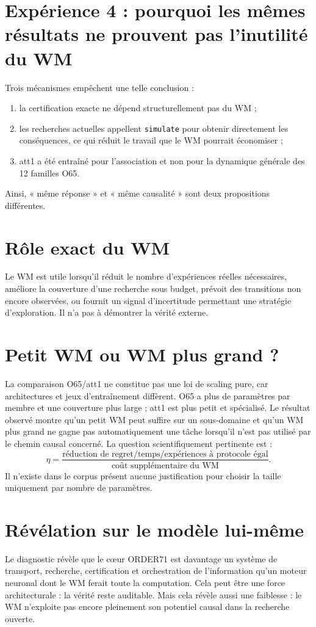 \documentclass[11pt,a4paper]{article}
\begin{document}
\section{Expérience 4 : pourquoi les mêmes résultats ne prouvent pas l'inutilité du WM}
Trois mécanismes empêchent une telle conclusion :
\begin{enumerate}
\item la certification exacte ne dépend structurellement pas du WM ;
\item les recherches actuelles appellent \texttt{simulate} pour obtenir directement les conséquences, ce qui réduit le travail que le WM pourrait économiser ;
\item att1 a été entraîné pour l'association et non pour la dynamique générale des 12 familles O65.
\end{enumerate}
Ainsi, « même réponse » et « même causalité » sont deux propositions différentes.
\section{Rôle exact du WM}
Le WM est utile lorsqu'il réduit le nombre d'expériences réelles nécessaires, améliore la couverture d'une recherche sous budget, prévoit des transitions non encore observées, ou fournit un signal d'incertitude permettant une stratégie d'exploration. Il n'a pas à démontrer la vérité externe.
\section{Petit WM ou WM plus grand ?}
La comparaison O65/att1 ne constitue pas une loi de scaling pure, car architectures et jeux d'entraînement diffèrent. O65 a plus de paramètres par membre et une couverture plus large ; att1 est plus petit et spécialisé. Le résultat observé montre qu'un petit WM peut suffire sur un sous-domaine et qu'un WM plus grand ne gagne pas automatiquement une tâche lorsqu'il n'est pas utilisé par le chemin causal concerné. La question scientifiquement pertinente est :
\[
\eta=\frac{\text{réduction de regret/temps/expériences à protocole égal}}{\text{coût supplémentaire du WM}}.
\]
Il n'existe dans le corpus présent aucune justification pour choisir la taille uniquement par nombre de paramètres.
\section{Révélation sur le modèle lui-même}
Le diagnostic révèle que le cœur ORDER71 est davantage un système de transport, recherche, certification et orchestration de l'information qu'un moteur neuronal dont le WM ferait toute la computation. Cela peut être une force architecturale : la vérité reste auditable. Mais cela révèle aussi une faiblesse : le WM n'exploite pas encore pleinement son potentiel causal dans la recherche ouverte.
\end{document}
